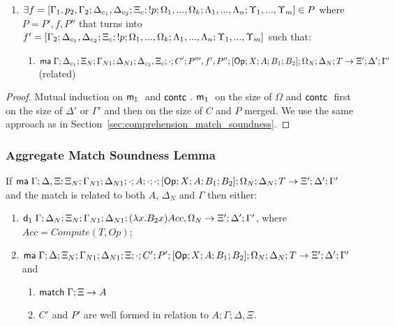\begin{theorem}
\begin{itemize}
\begin{enumerate}
      \item $\exists f = [\Gamma_1, p_2, \Gamma_2; \Delta_{c_1}, \Delta_{c_2}; \Xi_c; {!} p; \Omega_1, ..., \Omega_k; \Lambda_1, ..., \Lambda_n; \Upsilon_1, ..., \Upsilon_m] \in P$ where $P = P', f, P''$ that turns into $f' = [\Gamma_2; \Delta_{c_1}, \Delta_{c_2}; \Xi_c; {!} p; \Omega_1, ..., \Omega_k; \Lambda_1, ..., \Lambda_n; \Upsilon_1, ..., \Upsilon_m]$ such that:
            \begin{enumerate}
               \item $\mathsf{ma} \; \Gamma; \Delta_{c_1}; \Xi_N; \Gamma_{N1}; \Delta_{N1}; \Delta_{c_2}, \Xi_c; \cdot; C'; P''', f', P''; [\mathsf{Op} ; X ; A ; B_1; B_2]; \Omega_N; \Delta_N; T \rightarrow \Xi'; \Delta'; \Gamma'$ (related)
            \end{enumerate}
   \end{enumerate}
   \end{itemize}
\end{theorem}

\begin{proof}
   Mutual induction on $\mathsf{m}_1 \;$ and $\mathsf{contc} \;$. $\mathsf{m}_1 \;$ on the size of $\Omega$ and $\mathsf{contc} \;$ first on the size of $\Delta'$ or $\Gamma'$ and then on the size of $C$ and $P$ merged. We use the same approach as in Section~\ref{sec:comprehension_match_soundness}.
\end{proof}

\subsubsection{Aggregate Match Soundness Lemma}

\begin{lemma}
If $\mathsf{ma} \; \Gamma; \Delta, \Xi; \Xi_N; \Gamma_{N1}; \Delta_{N1}; \cdot; A; \cdot; \cdot; [\mathsf{Op} ; X ; A ; B_1; B_2]; \Omega_N; \Delta_N; T \rightarrow \Xi'; \Delta'; \Gamma'$ and the match is related to both $A$, $\Delta_N$ and $\Gamma$ then either:
\begin{enumerate}
   \item $\mathsf{d}_1 \; \Gamma; \Delta_N; \Xi_N; \Gamma_{N1}; \Delta_{N1}; (\lambda x. B_2 x)Acc, \Omega_N \rightarrow \Xi'; \Delta'; \Gamma'$, where $Acc = Compute(T, Op)$;
   \item $\mathsf{ma} \; \Gamma; \Delta; \Xi_N; \Gamma_{N1}; \Delta_{N1}; \Xi; \cdot; C'; P'; [\mathsf{Op} ; X ; A ; B_1; B_2]; \Omega_N; \Delta_N; T \rightarrow \Xi'; \Delta'; \Gamma'$ and
   \begin{enumerate}
      \item $\mathsf{match} \; \Gamma; \Xi \rightarrow A$
      \item $C'$ and $P'$ are well formed in relation to $A; \Gamma; \Delta, \Xi$.
   \end{enumerate}
\end{enumerate}
\end{lemma}

